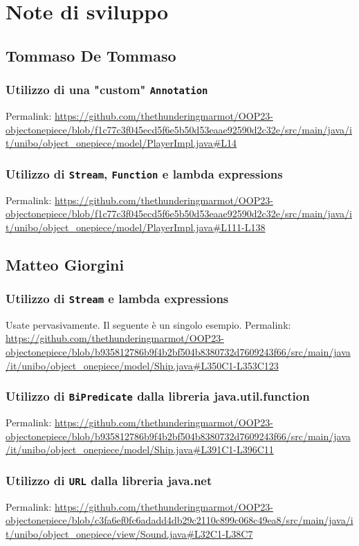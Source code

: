 \documentclass[a4paper,12pt]{report}
\begin{document}
\section{Note di sviluppo}

\subsection*{Tommaso De Tommaso}
\subsubsection{Utilizzo di una "custom" \texttt{Annotation} }
Permalink: \url{https://github.com/thethunderingmarmot/OOP23-objectonepiece/blob/f1c77c3f045ecd5f6e5b50d53eaae92590d2c32e/src/main/java/it/unibo/object_onepiece/model/PlayerImpl.java#L14}
\subsubsection{Utilizzo di \texttt{Stream}, \texttt{Function} e lambda expressions}
Permalink: \url{https://github.com/thethunderingmarmot/OOP23-objectonepiece/blob/f1c77c3f045ecd5f6e5b50d53eaae92590d2c32e/src/main/java/it/unibo/object_onepiece/model/PlayerImpl.java#L111-L138}

\subsection*{Matteo Giorgini}
\subsubsection{Utilizzo di \texttt{Stream} e lambda expressions}
Usate pervasivamente. Il seguente è un singolo esempio.
Permalink: \url{https://github.com/thethunderingmarmot/OOP23-objectonepiece/blob/b935812786b9f4b2bf504b8380732d7609243f66/src/main/java/it/unibo/object_onepiece/model/Ship.java#L350C1-L353C123}

\subsubsection{Utilizzo di \texttt{BiPredicate} dalla libreria java.util.function}
Permalink: \url{https://github.com/thethunderingmarmot/OOP23-objectonepiece/blob/b935812786b9f4b2bf504b8380732d7609243f66/src/main/java/it/unibo/object_onepiece/model/Ship.java#L391C1-L396C11}

\subsubsection{Utilizzo di \texttt{URL} dalla libreria java.net}
Permalink: \url{https://github.com/thethunderingmarmot/OOP23-objectonepiece/blob/c3fa6ef0fc6adadd4db29c2110c899c068c49ea8/src/main/java/it/unibo/object_onepiece/view/Sound.java#L32C1-L38C7}
\end{document}
